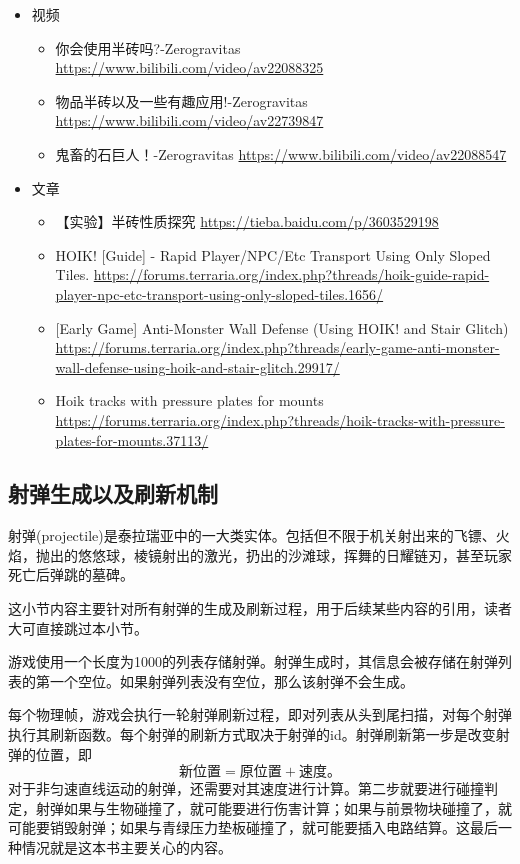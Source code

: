 \begin{itemize}
\item 视频
\begin{itemize}
\item 你会使用半砖吗?-Zerogravitas \url{https://www.bilibili.com/video/av22088325}
\item 物品半砖以及一些有趣应用!-Zerogravitas \url{https://www.bilibili.com/video/av22739847}
\item 鬼畜的石巨人！-Zerogravitas \url{https://www.bilibili.com/video/av22088547}
\end{itemize}
\item 文章
\begin{itemize}
\item 【实验】半砖性质探究 \url{https://tieba.baidu.com/p/3603529198}
\item HOIK! [Guide] - Rapid Player/NPC/Etc Transport Using Only Sloped Tiles. \url{https://forums.terraria.org/index.php?threads/hoik-guide-rapid-player-npc-etc-transport-using-only-sloped-tiles.1656/}
\item {[}Early Game] Anti-Monster Wall Defense (Using HOIK! and Stair Glitch) \url{https://forums.terraria.org/index.php?threads/early-game-anti-monster-wall-defense-using-hoik-and-stair-glitch.29917/}
\item Hoik tracks with pressure plates for mounts \url{https://forums.terraria.org/index.php?threads/hoik-tracks-with-pressure-plates-for-mounts.37113/}
\end{itemize}
\end{itemize}

\subsection{射弹生成以及刷新机制}
射弹(projectile)是泰拉瑞亚中的一大类实体。包括但不限于机关射出来的飞镖、火焰，抛出的悠悠球，棱镜射出的激光，扔出的沙滩球，挥舞的日耀链刃，甚至玩家死亡后弹跳的墓碑。

这小节内容主要针对所有射弹的生成及刷新过程，用于后续某些内容的引用，读者大可直接跳过本小节。

游戏使用一个长度为1000的列表存储射弹。射弹生成时，其信息会被存储在射弹列表的第一个空位。如果射弹列表没有空位，那么该射弹不会生成。

每个物理帧，游戏会执行一轮射弹刷新过程，即对列表从头到尾扫描，对每个射弹执行其刷新函数。每个射弹的刷新方式取决于射弹的id。射弹刷新第一步是改变射弹的位置，即$$\textrm{新位置}=\textrm{原位置}+\textrm{速度。}$$对于非匀速直线运动的射弹，还需要对其速度进行计算。第二步就要进行碰撞判定，射弹如果与生物碰撞了，就可能要进行伤害计算；如果与前景物块碰撞了，就可能要销毁射弹；如果与青绿压力垫板碰撞了，就可能要插入电路结算。这最后一种情况就是这本书主要关心的内容。

